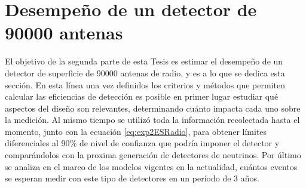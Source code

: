 



% 
% 	

	
\section{Desempe\~no de un detector de 90000 antenas}
	
	El objetivo de la segunda parte de esta Tesis es estimar el desempe\~no de un detector de superficie de 90000 antenas de radio, y es a lo que se dedica esta secci\'on.
	En esta l\'inea una vez definidos los criterios y m\'etodos que permiten calcular las eficiencias de detecci\'on es posible en primer lugar estudiar qu\'e aspectos del dise\~no son relevantes, determinando cu\'anto impacta cada uno sobre la medici\'on.
	Al mismo tiempo se utiliz\'o toda la informaci\'on recolectada hasta el momento, junto con la ecuaci\'on \ref{eq:exp2ESRadio}, para obtener l\'imites diferenciales al 90$\%$ de nivel de confianza que podr\'ia imponer el detector y compar\'andolos con la proxima generaci\'on de detectores de neutrinos.
	Por \'ultimo se analiza en el marco de los modelos vigentes en la actualidad, cu\'antos eventos se esperan medir con este tipo de detectores en un per\'iodo de 3 a\~nos.
	
